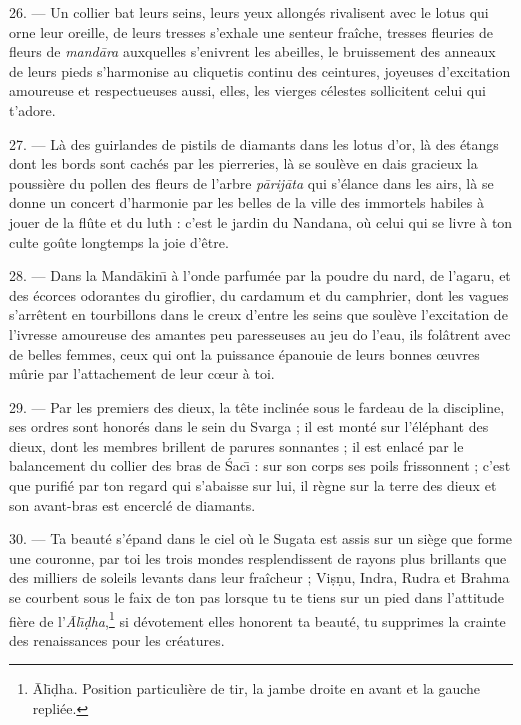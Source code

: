 \documentclass[a4paper, 11pt, oneside, french]{article}
\begin{document}
26. --- Un collier bat leurs seins, leurs yeux allongés rivalisent avec le lotus qui orne leur oreille, de leurs tresses s'exhale une senteur fraîche, tresses fleuries de fleurs de \emph{mand\={a}ra} auxquelles s'enivrent les abeilles, le bruissement des anneaux de leurs pieds s'harmonise au cliquetis continu des ceintures, joyeuses d'excitation amoureuse et respectueuses aussi, elles, les vierges célestes sollicitent celui qui t'adore.

27. --- Là des guirlandes de pistils de diamants dans les lotus d'or, là des étangs dont les bords sont cachés par les pierreries, là se soulève en dais gracieux la poussière du pollen des fleurs de l'arbre \emph{p\={a}rij\={a}ta} qui s'élance dans les airs, là se donne un concert d'harmonie par les belles de la ville des immortels habiles à jouer de la flûte et du luth : c'est le jardin du Nandana, où celui qui se livre à ton culte goûte longtemps la joie d'être.

28. --- Dans la Mand\={a}kin\={\i} à l'onde parfumée par la poudre du nard, de l'agaru, et des écorces odorantes du giroflier, du cardamum et du camphrier, dont les vagues s'arrêtent en tourbillons dans le creux d'entre les seins que soulève l'excitation de l'ivresse amoureuse des amantes peu paresseuses au jeu do l'eau, ils folâtrent avec de belles femmes, ceux qui ont la puissance épanouie de leurs bonnes œuvres mûrie par l'attachement de leur cœur à toi.

29. --- Par les premiers des dieux, la tête inclinée sous le fardeau de la discipline, ses ordres sont honorés dans le sein du Svarga ; il est monté sur l'éléphant des dieux, dont les membres brillent de parures sonnantes ; il est enlacé par le balancement du collier des bras de \'{S}ac\={\i} : sur son corps ses poils frissonnent ; c'est que purifié par ton regard qui s'abaisse sur lui, il règne sur la terre des dieux et son avant-bras est encerclé de diamants.

30. --- Ta beauté s'épand dans le ciel où le Sugata est assis sur un siège que forme une couronne, par toi les trois mondes resplendissent de rayons plus brillants que des milliers de soleils levants dans leur fraîcheur ; Vi\d{s}\d{n}u, Indra, Rudra et Brahma se courbent sous le faix de ton pas lorsque tu te tiens sur un pied dans l'attitude fière de l'\emph{\={A}l\={\i}\d{d}ha},\footnote{\={A}l\={\i}\d{d}ha. Position particulière de tir, la jambe droite en avant et la gauche repliée.} si dévotement elles honorent ta beauté, tu supprimes la crainte des renaissances pour les créatures.
\end{document}
